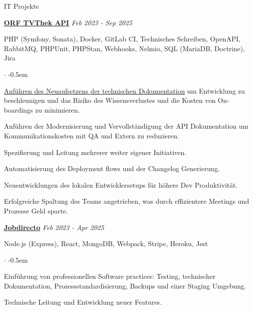 \documentclass{cv}
\begin{document}
\begin{rSection}{IT Projekte}



  \textbf{\href{https://tvthek.orf.at/}{ORF TVThek API}}
  \hfill
  {\em Feb 2023 - Sep 2025}

  PHP (Symfony, Sonata), Docker, GitLab CI, Technisches Schreiben, OpenAPI, RabbitMQ, PHPUnit, PHPStan, Webhooks, Nelmio, SQL (MariaDB, Doctrine), Jira
  \begin{list}{$\cdot$}{}
  \itemsep -0.5em \vspace{-0.5em}
    \smallskip
  \item \href{https://jneidel.com/dev/technical-documentation-with-arc42/}{Anführen des Neuaufsetzens der technischen Dokumentation} um Entwicklung zu beschleunigen und das Risiko des Wissensverlustes und die Kosten von On-boardings zu minimieren.
  \item Anführen der Modernisierung und Vervollständigung der API Dokumentation um Kommunikationskosten mit QA und Extern zu reduzieren.
  \item Spezifierung und Leitung mehrerer weiter eigener Initiativen.
  \item Automatisierung des Deployment flows und der Changelog Generierung.
  \item Neuentwicklungen des lokalen Entwicklersetups für höhere Dev Produktivität.
  \item Erfolgreiche Spaltung des Teams angetrieben, was durch effizientere Meetings und Prozesse Geld sparte.
  \end{list}

  \textbf{\href{https://www.jobdirecto.com/}{Jobdirecto}}
  \hfill
  {\em Feb 2023 - Apr 2025}

  Node.js (Express), React, MongoDB, Webpack, Stripe, Heroku, Jest
  \begin{list}{$\cdot$}{}
  \itemsep -0.5em \vspace{-0.5em}
    \smallskip
    \item Einführung von professionellen Software practices: Testing, technischer Dokumentation, Prozessstandardisierung, Backups und einer Staging Umgebung.
    \item Technische Leitung und Entwicklung neuer Features.
  \end{list}


\end{rSection}
\end{document}
